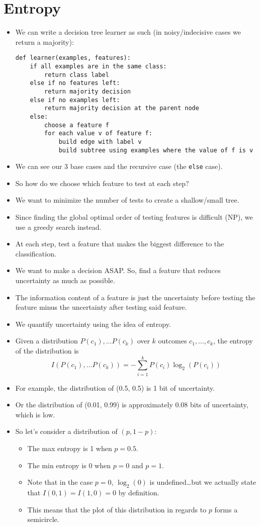 \documentclass{article}
\begin{document}
\section{Entropy}
\begin{itemize}
    \item We can write a decision tree learner as such (in noisy/indecisive cases we return a majority):
\begin{lstlisting}
def learner(examples, features):
    if all examples are in the same class:
        return class label
    else if no features left:
        return majority decision
    else if no examples left:
        return majority decision at the parent node
    else:
        choose a feature f
        for each value v of feature f:
            build edge with label v
            build subtree using examples where the value of f is v
\end{lstlisting}
    \item We can see our 3 base cases and the recursive case (the \lstinline{else} case).
    \item So how do we choose which feature to test at each step?
    \item We want to minimize the number of tests to create a shallow/small tree.
    \item Since finding the global optimal order of testing features is difficult (NP), we use a greedy search instead.
    \item At each step, test a feature that makes the biggest difference to the classification.
    \item We want to make a decision ASAP.  So, find a feature that reduces uncertainty as much as possible.
    \item The information content of a feature is just the uncertainty before testing the feature minus the uncertainty after testing said feature.
    \item We quantify uncertainty using the idea of entropy.
    \item Given a distribution $P(c_1), \dots P(c_k)$ over $k$ outcomes $c_1,\dots,c_k$, the entropy of the distribution is 
        \[I(P(c_1),\dots P(c_k)) = -\sum_{i = 1}^k P(c_i)\log_2(P(c_i))\]
    \item For example, the distribution of (0.5, 0.5) is 1 bit of uncertainty.
    \item Or the distribution of (0.01, 0.99) is approximately 0.08 bits of uncertainty, which is low.
    \item So let's consider a distribution of $(p, 1 - p)$:
        \begin{itemize}
            \item The max entropy is 1 when $p = 0.5$.
            \item The min entropy is 0 when $p = 0$ and $p = 1$.
            \item Note that in the case $p = 0$, $\log_2(0)$ is undefined\dots but we actually state that $I(0, 1) = I(1, 0) = 0$ by definition.
            \item This means that the plot of this distribution in regards to $p$ forms a semicircle.
        \end{itemize}
\end{itemize}
\end{document}
